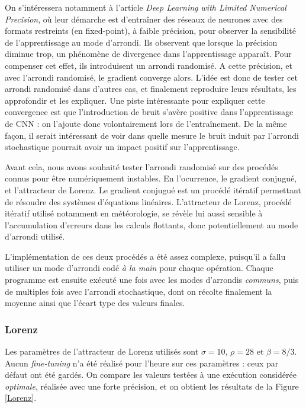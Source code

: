 \documentclass[a4paper,11pt]{article}
\begin{document}
On s'intéressera notamment à l'article \textit{Deep Learning with Limited Numerical Precision}\cite{gupta2015deep}, où leur démarche est d'entraîner des réseaux de neurones avec des formats restreints (en fixed-point), à faible précision, pour observer la sensibilité de l’apprentissage au mode d’arrondi.
Ils observent que lorsque la précision diminue trop, un phénomène de divergence dans l'apprentissage apparaît. Pour compenser cet effet, ils introduisent un arrondi randomisé. A cette précision, et avec l'arrondi randomisé, le gradient converge alors.
L’idée est donc de tester cet arrondi randomisé dans d’autres cas, et finalement reproduire leurs résultats, les approfondir et les expliquer.
Une piste intéressante pour expliquer cette convergence est que l’introduction de bruit s’avère positive dans l’apprentissage de CNN : on l’ajoute donc volontairement lors de l’entraînement. De la même façon, il serait intéressant de voir dans quelle mesure le bruit induit par l’arrondi stochastique pourrait avoir un impact positif sur l’apprentissage.

Avant cela, nous avons souhaité tester l’arrondi randomisé sur des procédés connus pour être numériquement instables. En l'ocurrence, le gradient conjugué, et l'attracteur de Lorenz. Le gradient conjugué est un procédé itératif permettant de résoudre des systèmes d’équations linéaires\cite{shewchuk1994introduction}.
L'attracteur de Lorenz, procédé itératif utilisé notamment en météorologie, se révèle lui aussi sensible à l'accumulation d'erreurs dans les calculs flottants, donc potentiellement au mode d’arrondi utilisé.

L’implémentation de ces deux procédés a été assez complexe, puisqu’il a fallu utiliser un mode d’arrondi codé \textit{à la main} pour chaque opération.
Chaque programme est ensuite exécuté une fois avec les modes d'arrondis \textit{communs}, puis de multiples fois avec l'arrondi stochastique, dont on récolte finalement la moyenne ainsi que l'écart type des valeurs finales.

\subsubsection{Lorenz}
Les paramètres de l'attracteur de Lorenz utilisés sont $\sigma = 10$, $\rho = 28$ et $\beta = 8/3$. Aucun \textit{fine-tuning} n'a été réalisé pour l'heure sur ces paramètres : ceux par défaut ont été gardés.
On compare les valeurs testées à une exécution considérée \textit{optimale}, réalisée avec une forte précision, et on obtient les résultats de la Figure \ref{Lorenz}.
\end{document}
